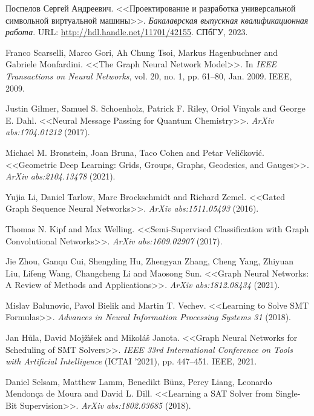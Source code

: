 \begin{thebibliography}{1}
 Поспелов Сергей Андреевич. <<Проектирование и разработка универсальной символьной виртуальной машины>>. \textit{Бакалаврская выпускная квалификационная работа}. URL: \url{http://hdl.handle.net/11701/42155}. СПбГУ, 2023.

 Franco Scarselli, Marco Gori, Ah Chung Tsoi, Markus Hagenbuchner and Gabriele Monfardini. <<The Graph Neural Network Model>>. In \textit{IEEE Transactions on Neural Networks}, vol. 20, no. 1, pp. 61--80, Jan. 2009. IEEE, 2009.

 Justin Gilmer, Samuel S. Schoenholz, Patrick F. Riley, Oriol Vinyals and George E. Dahl. <<Neural Message Passing for Quantum Chemistry>>. \textit{ArXiv abs:1704.01212} (2017).

 Michael M. Bronstein, Joan Bruna, Taco Cohen and Petar Veli\v{c}kovi\'{c}. <<Geometric Deep Learning: Grids, Groups, Graphs, Geodesics, and Gauges>>. \textit{ArXiv abs:2104.13478} (2021).

 Yujia Li, Daniel Tarlow, Marc Brockschmidt and Richard Zemel. <<Gated Graph Sequence Neural Networks>>. \textit{ArXiv abs:1511.05493} (2016).

 Thomas N. Kipf and Max Welling. <<Semi-Supervised Classification with Graph Convolutional Networks>>. \textit{ArXiv abs:1609.02907} (2017).

 Jie Zhou, Ganqu Cui, Shengding Hu, Zhengyan Zhang, Cheng Yang, Zhiyuan Liu, Lifeng Wang, Changcheng Li and Maosong Sun. <<Graph Neural Networks: A Review of Methods and Applications>>. \textit{ArXiv abs:1812.08434} (2021).

 Mislav Balunovic, Pavol Bielik and Martin T. Vechev. <<Learning to Solve SMT Formulas>>. \textit{Advances in Neural Information Processing Systems 31} (2018).

 Jan H\r{u}la, David Moj\v{z}\'{\i}\v{s}ek and Mikol\'{a}\v{s} Janota. <<Graph Neural Networks for Scheduling of SMT Solvers>>. \textit{IEEE 33rd International Conference on Tools with Artificial Intelligence} (ICTAI '2021), pp. 447--451. IEEE, 2021.

 Daniel Selsam, Matthew Lamm, Benedikt B\"{u}nz, Percy Liang, Leonardo Mendonça de Moura and David L. Dill. <<Learning a SAT Solver from Single-Bit Supervision>>. \textit{ArXiv abs:1802.03685} (2018).


\end{thebibliography}
